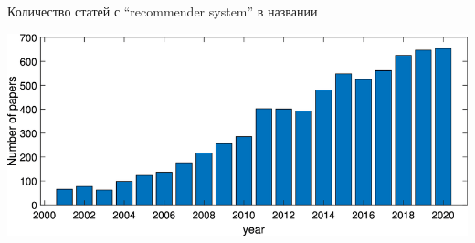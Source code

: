 \documentclass[11pt,aspectratio=169,handout]{beamer}
\begin{document}
\begin{frame}{Количество статей с ``recommender system'' в названии}
\begin{center}
\includegraphics[scale=1.5]{images/publications.png}
\end{center}
\end{frame}
\end{document}
